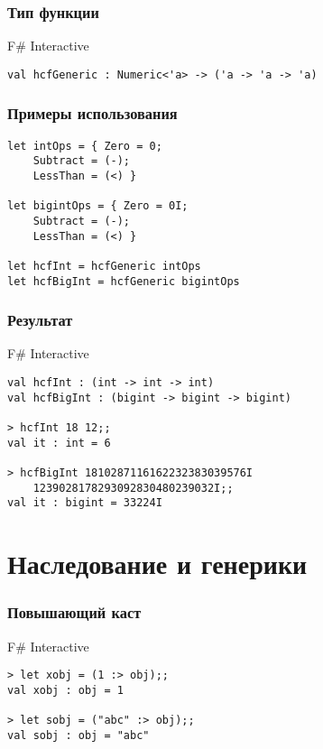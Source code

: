 \documentclass[xetex,mathserif,serif]{beamer}
\begin{document}
    \begin{frame}[fragile]
        \frametitle{Тип функции}
        \begin{alertblock}{F\# Interactive}
            \begin{verbatim}
val hcfGeneric : Numeric<'a> -> ('a -> 'a -> 'a)
            \end{verbatim}
        \end{alertblock}
    \end{frame}

    \begin{frame}[fragile]
        \frametitle{Примеры использования}
        \begin{verbatim}
let intOps = { Zero = 0; 
    Subtract = (-); 
    LessThan = (<) }
    
let bigintOps = { Zero = 0I; 
    Subtract = (-); 
    LessThan = (<) }

let hcfInt = hcfGeneric intOps
let hcfBigInt = hcfGeneric bigintOps
        \end{verbatim}
    \end{frame}

    \begin{frame}[fragile]
        \frametitle{Результат}
        \begin{alertblock}{F\# Interactive}
            \begin{verbatim}
val hcfInt : (int -> int -> int)
val hcfBigInt : (bigint -> bigint -> bigint)

> hcfInt 18 12;;
val it : int = 6

> hcfBigInt 1810287116162232383039576I 
    1239028178293092830480239032I;;
val it : bigint = 33224I
            \end{verbatim}
        \end{alertblock}
    \end{frame}

    \section{Наследование и генерики}
    
    \begin{frame}[fragile]
        \frametitle{Повышающий каст}
        \begin{alertblock}{F\# Interactive}
            \begin{verbatim}
> let xobj = (1 :> obj);;
val xobj : obj = 1

> let sobj = ("abc" :> obj);;
val sobj : obj = "abc"
            \end{verbatim}
        \end{alertblock}
    \end{frame}
\end{document}
